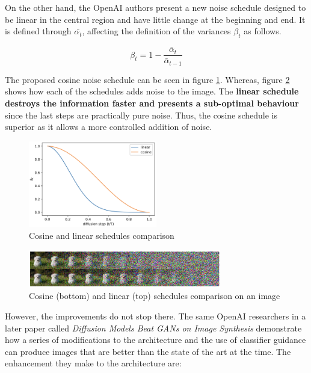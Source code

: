On the other hand, the OpenAI authors present a new noise schedule designed to be linear in the central region and have little change at the beginning and end. It is defined through $ \bar{\alpha_t}$, affecting the definition of the variances $\beta_t$ as follows.

\[\beta_t = 1 - \frac{\bar{\alpha}_t}{\bar{\alpha}_{t-1}}\]

The proposed cosine noise schedule can be seen in figure \ref{fig:CosineSC}. Whereas, figure \ref{fig:CosineEX} shows how each of the schedules adds noise to the image. The \textbf{linear schedule destroys the information faster and presents a sub-optimal behaviour} since the last steps are practically pure noise. Thus, the cosine schedule is superior as it allows a more controlled addition of noise.

\begin{figure}
    \centering
    \includegraphics[width=0.5\textwidth]{Pictures/cosineSC.png} 
    \caption{Cosine and linear schedules comparison \cite{nichol2021improved}}
    \label{fig:CosineSC}
\end{figure}

\begin{figure}
    \centering
    \includegraphics[width=0.75\textwidth]{Pictures/cosineEX.png} 
    \caption{Cosine (bottom) and linear (top) schedules comparison on an image \cite{nichol2021improved}}
    \label{fig:CosineEX}
\end{figure}

However, the improvements do not stop there. The same OpenAI researchers in a later paper called \textit{Diffusion Models Beat GANs on Image Synthesis} \cite{dhariwal2021diffusion} demonstrate how a series of modifications to the architecture and the use of classifier guidance can produce images that are better than the state of the art at the time. The enhancement they make to the architecture are:

